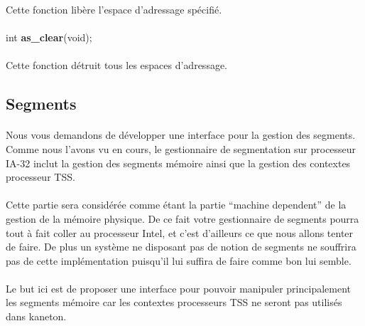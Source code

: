 \documentclass[10pt,a4wide]{article}
\begin{document}
Cette fonction lib\`ere l'espace d'adressage sp\'ecifi\'e.

\paragraph{}

\hspace{1.5cm}int \textbf{as\_clear}(void);

\paragraph{}

Cette fonction d\'etruit tous les espaces d'adressage.

\subsection{Segments}

\paragraph{}

Nous vous demandons de d\'evelopper une interface pour la gestion des
segments. Comme nous l'avons vu en cours, le gestionnaire
de segmentation sur processeur IA-32 inclut la gestion des segments
m\'emoire ainsi que la gestion des contextes processeur TSS.

\paragraph{}

Cette partie sera consid\'er\'ee comme \'etant la partie ``machine
dependent'' de la gestion de la m\'emoire physique. De ce fait votre
gestionnaire de segments pourra tout \`a fait coller au processeur
Intel, et c'est d'ailleurs ce que nous allons tenter de faire.
De plus un syst\`eme ne disposant pas de notion de segments ne souffrira
pas de cette impl\'ementation puisqu'il lui suffira de faire comme bon
lui semble.

\paragraph{}

Le but ici est de proposer une interface pour pouvoir manipuler principalement
les segments m\'emoire car les contextes processeurs TSS ne seront pas
utilis\'es dans kaneton.

\paragraph{}
\end{document}
